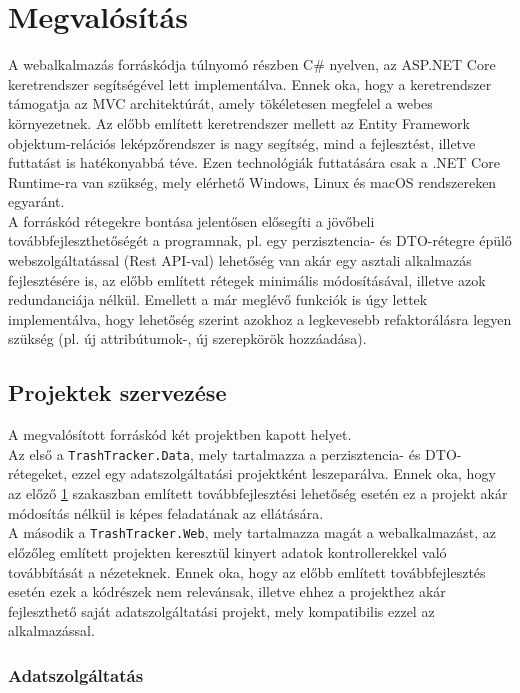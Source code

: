 \section{Megvalósítás}
\label{sec:implementation}

A webalkalmazás forráskódja túlnyomó részben C\# nyelven, az ASP.NET Core keretrendszer segítségével lett implementálva. Ennek oka, hogy a keretrendszer támogatja az MVC architektúrát, amely tökéletesen megfelel a webes környezetnek. Az előbb említett keretrendszer mellett az Entity Framework objektum-relációs leképzőrendszer is nagy segítség, mind a fejlesztést, illetve futtatást is hatékonyabbá téve. Ezen technológiák futtatására csak a .NET Core Runtime-ra van szükség, mely elérhető Windows, Linux és macOS rendszereken egyaránt.\\
A forráskód rétegekre bontása jelentősen elősegíti a jövőbeli továbbfejleszthetőségét a programnak, pl. egy perzisztencia- és DTO-rétegre épülő webszolgáltatással (Rest API-val) lehetőség van akár egy asztali alkalmazás fejlesztésére is, az előbb említett rétegek minimális módosításával, illetve azok redundanciája nélkül. Emellett a már meglévő funkciók is úgy lettek implementálva, hogy lehetőség szerint azokhoz a legkevesebb refaktorálásra legyen szükség (pl. új attribútumok-, új szerepkörök hozzáadása).

\subsection{Projektek szervezése}

A megvalósított forráskód két projektben kapott helyet.\\
Az első a \texttt{TrashTracker.Data}, mely tartalmazza a perzisztencia- és DTO-rétegeket, ezzel egy adatszolgáltatási projektként leszeparálva. Ennek oka, hogy az előző \ref{sec:implementation} szakaszban említett továbbfejlesztési lehetőség esetén ez a projekt akár módosítás nélkül is képes feladatának az ellátására.\\
A második a \texttt{TrashTracker.Web}, mely tartalmazza magát a webalkalmazást, az előzőleg említett projekten keresztül kinyert adatok kontrollerekkel való továbbítását a nézeteknek. Ennek oka, hogy az előbb említett továbbfejlesztés esetén ezek a kódrészek nem relevánsak, illetve ehhez a projekthez akár fejleszthető saját adatszolgáltatási projekt, mely kompatibilis ezzel az alkalmazással.

\subsubsection{Adatszolgáltatás}



